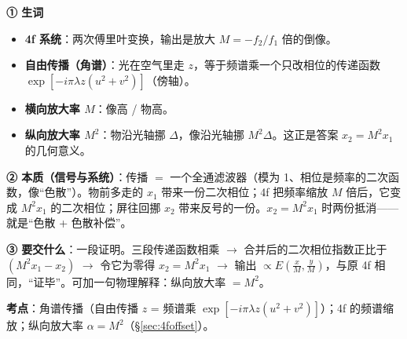 \label{rd:v-4fshift}
\begin{idea}[读题：概念与要交什么]
\textbf{① 生词}
\begin{itemize}
\item \textbf{4f 系统}：两次傅里叶变换，输出是放大 $M=-f_2/f_1$ 倍的倒像。
\item \textbf{自由传播（角谱）}：光在空气里走 $z$，等于频谱乘一个只改相位的传递函数 $\exp[-i\pi\lambda z(u^2+v^2)]$（傍轴）。
\item \textbf{横向放大率 $M$}：像高 / 物高。
\item \textbf{纵向放大率 $M^2$}：物沿光轴挪 $\Delta$，像沿光轴挪 $M^2\Delta$。这正是答案 $x_2=M^2x_1$ 的几何意义。
\end{itemize}
\textbf{② 本质（信号与系统）}：传播 $=$ 一个全通滤波器（模为 1、相位是频率的二次函数，像“色散”）。物前多走的 $x_1$ 带来一份二次相位；4f 把频率缩放 $M$ 倍后，它变成 $M^2x_1$ 的二次相位；屏往回挪 $x_2$ 带来反号的一份。$x_2=M^2x_1$ 时两份抵消——就是“色散 + 色散补偿”。

\textbf{③ 要交什么}：一段证明。三段传递函数相乘 $\to$ 合并后的二次相位指数正比于 $(M^2x_1-x_2)$ $\to$ 令它为零得 $x_2=M^2x_1$ $\to$ 输出 $\propto E(\frac xM,\frac yM)$，与原 4f 相同，“证毕”。可加一句物理解释：纵向放大率 $=M^2$。
\end{idea}


\textbf{考点}：角谱传播（自由传播 $z$ = 频谱乘 $\exp[-i\pi\lambda z(u^2+v^2)]$）；4f 的频谱缩放；纵向放大率 $\alpha=M^2$（§\ref{sec:4foffset}）。

